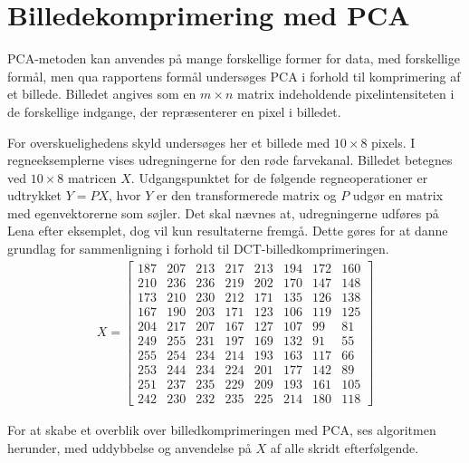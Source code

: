 \section{Billedekomprimering med PCA}
PCA-metoden kan anvendes på mange forskellige former for data, med forskellige formål, men qua rapportens formål undersøges PCA i forhold til komprimering af et billede. Billedet angives som en $m \times n$ matrix indeholdende pixelintensiteten i de forskellige indgange, der repræsenterer en pixel i billedet.

For overskuelighedens skyld undersøges her et billede med $10 \times 8$ pixels. I regneeksemplerne vises udregningerne for den røde farvekanal. Billedet betegnes ved $10 \times 8$ matricen $X$. Udgangspunktet for de følgende regneoperationer er udtrykket $Y = PX$, hvor $Y$ er den transformerede matrix og $P$ udgør en matrix med egenvektorerne som søjler. Det skal nævnes at, udregningerne udføres på Lena efter eksemplet, dog vil kun resultaterne fremgå. Dette gøres for at danne grundlag for sammenligning i forhold til DCT-billedkomprimeringen.
\begin{align}
X= \begin{bmatrix}
187 & 207 & 213 & 217 & 213 & 194 & 172 & 160 \\
210 & 236 & 236 & 219 & 202 & 170 & 147 & 148 \\
173 & 210 & 230 & 212 & 171 & 135 & 126 & 138 \\
167 & 190 & 203 & 171 & 123 & 106 & 119 & 125 \\
204 & 217 & 207 & 167 & 127 & 107 & 99 & 81 \\
249 & 255  & 231 & 197 & 169 & 132 & 91 & 55 \\
255 & 254 & 234 & 214 & 193 & 163 & 117 & 66 \\
253 & 244 & 234 & 224 & 201 & 177 & 142 & 89 \\
251 & 237 & 235 & 229 & 209 & 193 & 161 & 105 \\
242 & 230 & 232 & 235 & 225 & 214 & 180 & 118
\end{bmatrix}
\label{eq:X_anvendelse}
\end{align}

For at skabe et overblik over billedkomprimeringen med PCA, ses algoritmen herunder, med uddybbelse og anvendelse på $X$ af alle skridt efterfølgende.

